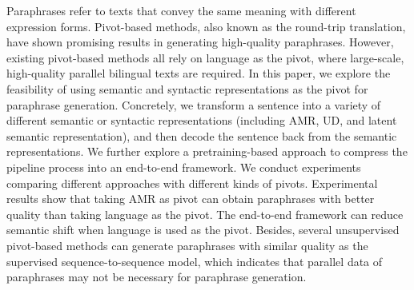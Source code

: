 Paraphrases refer to texts that convey the same meaning with different expression forms. Pivot-based methods, also known as the round-trip translation, have shown promising results in generating high-quality paraphrases. However, existing pivot-based methods all rely on language as the pivot, where large-scale, high-quality parallel bilingual texts are required. In this paper, we explore the feasibility of using semantic and syntactic representations as the pivot for paraphrase generation. Concretely, we transform a sentence into a variety of different semantic or syntactic representations (including AMR, UD, and latent semantic representation), and then decode the sentence back from the semantic representations. We further explore a pretraining-based approach to compress the pipeline process into an end-to-end framework. We conduct experiments comparing different approaches with different kinds of pivots. Experimental results show that taking AMR as pivot can obtain paraphrases with better quality than taking language as the pivot. The end-to-end framework can reduce semantic shift when language is used as the pivot. Besides, several unsupervised pivot-based methods can generate paraphrases with similar quality as the supervised sequence-to-sequence model, which indicates that parallel data of paraphrases may not be necessary for paraphrase generation.
